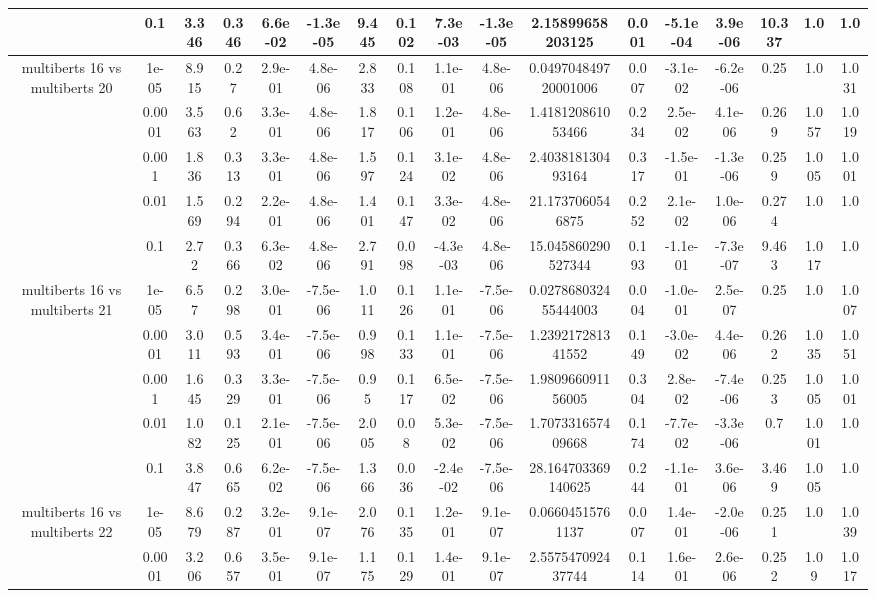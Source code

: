 \begin{tabular}{|c|c|c|c|c|c|c|c|c|c|c|c|c|c|c|c|c|}
 & 0.1 & 3.346 & 0.346 & 6.6e-02 & -1.3e-05 & 9.445 & 0.102 & 7.3e-03 & -1.3e-05 & 2.15899658203125 & 0.001 & -5.1e-04 & 3.9e-06 & 10.337 & 1.0 & 1.0 \\
\hline
\multirow{5}{*}{multiberts 16 vs multiberts 20} & 1e-05 & 8.915 & 0.27 & 2.9e-01 & 4.8e-06 & 2.833 & 0.108 & 1.1e-01 & 4.8e-06 & 0.049704849720001006 & 0.007 & -3.1e-02 & -6.2e-06 & 0.25 & 1.0 & 1.031 \\
 & 0.0001 & 3.563 & 0.62 & 3.3e-01 & 4.8e-06 & 1.817 & 0.106 & 1.2e-01 & 4.8e-06 & 1.418120861053466 & 0.234 & 2.5e-02 & 4.1e-06 & 0.269 & 1.057 & 1.019 \\
 & 0.001 & 1.836 & 0.313 & 3.3e-01 & 4.8e-06 & 1.597 & 0.124 & 3.1e-02 & 4.8e-06 & 2.403818130493164 & 0.317 & -1.5e-01 & -1.3e-06 & 0.259 & 1.005 & 1.001 \\
 & 0.01 & 1.569 & 0.294 & 2.2e-01 & 4.8e-06 & 1.401 & 0.147 & 3.3e-02 & 4.8e-06 & 21.1737060546875 & 0.252 & 2.1e-02 & 1.0e-06 & 0.274 & 1.0 & 1.0 \\
 & 0.1 & 2.72 & 0.366 & 6.3e-02 & 4.8e-06 & 2.791 & 0.098 & -4.3e-03 & 4.8e-06 & 15.045860290527344 & 0.193 & -1.1e-01 & -7.3e-07 & 9.463 & 1.017 & 1.0 \\
\hline
\multirow{5}{*}{multiberts 16 vs multiberts 21} & 1e-05 & 6.57 & 0.298 & 3.0e-01 & -7.5e-06 & 1.011 & 0.126 & 1.1e-01 & -7.5e-06 & 0.027868032455444003 & 0.004 & -1.0e-01 & 2.5e-07 & 0.25 & 1.0 & 1.007 \\
 & 0.0001 & 3.011 & 0.593 & 3.4e-01 & -7.5e-06 & 0.998 & 0.133 & 1.1e-01 & -7.5e-06 & 1.239217281341552 & 0.149 & -3.0e-02 & 4.4e-06 & 0.262 & 1.035 & 1.051 \\
 & 0.001 & 1.645 & 0.329 & 3.3e-01 & -7.5e-06 & 0.95 & 0.117 & 6.5e-02 & -7.5e-06 & 1.980966091156005 & 0.304 & 2.8e-02 & -7.4e-06 & 0.253 & 1.005 & 1.001 \\
 & 0.01 & 1.082 & 0.125 & 2.1e-01 & -7.5e-06 & 2.005 & 0.08 & 5.3e-02 & -7.5e-06 & 1.707331657409668 & 0.174 & -7.7e-02 & -3.3e-06 & 0.7 & 1.001 & 1.0 \\
 & 0.1 & 3.847 & 0.665 & 6.2e-02 & -7.5e-06 & 1.366 & 0.036 & -2.4e-02 & -7.5e-06 & 28.164703369140625 & 0.244 & -1.1e-01 & 3.6e-06 & 3.469 & 1.005 & 1.0 \\
\hline
\multirow{5}{*}{multiberts 16 vs multiberts 22} & 1e-05 & 8.679 & 0.287 & 3.2e-01 & 9.1e-07 & 2.076 & 0.135 & 1.2e-01 & 9.1e-07 & 0.06604515761137 & 0.007 & 1.4e-01 & -2.0e-06 & 0.251 & 1.0 & 1.039 \\
 & 0.0001 & 3.206 & 0.657 & 3.5e-01 & 9.1e-07 & 1.175 & 0.129 & 1.4e-01 & 9.1e-07 & 2.557547092437744 & 0.114 & 1.6e-01 & 2.6e-06 & 0.252 & 1.09 & 1.017 \\

\end{tabular}
